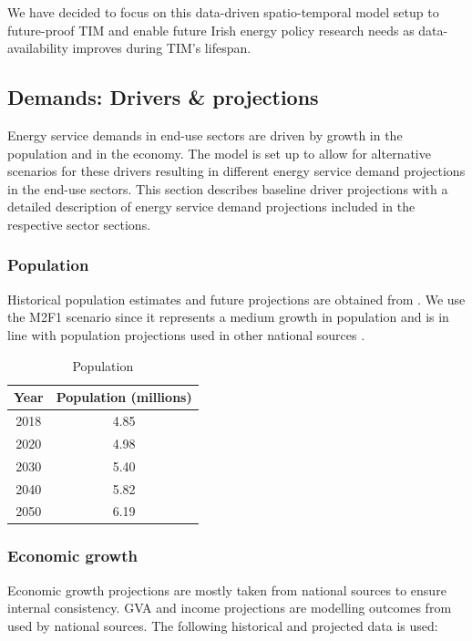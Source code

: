 \documentclass[gmd,manuscript]{copernicus}
\begin{document}
We have decided to focus on this data-driven spatio-temporal model setup to future-proof TIM and enable future Irish energy policy research needs as data-availability improves during TIM's lifespan.

\subsection{Demands: Drivers \& projections}
\label{ss:model_proj}
Energy service demands in end-use sectors are driven by growth in the population and in the economy. The model is set up to allow for alternative scenarios for these drivers resulting in different energy service demand projections in the end-use sectors. This section describes baseline driver projections with a detailed description of energy service demand projections included in the respective sector sections. 

\subsubsection{Population}
Historical population estimates and future projections are obtained from \citet{CentralStatisticsOffice2020}. We use the M2F1 scenario since it represents a medium growth in population and is in line with population projections used in other national sources \citep{Yakut2020}.

\begin{table}[htbp]
 \centering
 \footnotesize
 \caption{Population}
 \begin{tabular}{cc}
 \hline
 Year & Population (millions) \\
 \hline
 2018 & 4.85 \\
 2020 & 4.98 \\
 2030 & 5.40 \\
 2040 & 5.82 \\
 2050 & 6.19 \\
 \hline
 \end{tabular}%
 \label{tab:pop}%
\end{table}%


\subsubsection{Economic growth}
Economic growth projections are mostly taken from national sources to ensure internal consistency. GVA and income projections are modelling outcomes from \citet{bergin2017cosmo} used by national sources. The following historical and projected data is used:
\end{document}

